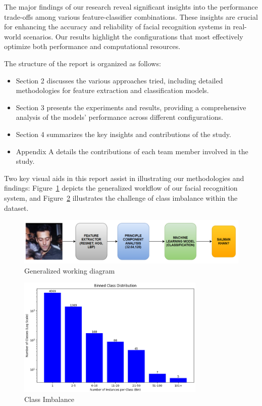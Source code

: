 \documentclass[a4paper]{article}
\theoremstyle{plain}
\theoremstyle{definition}
\begin{document}
The major findings of our research reveal significant insights into the performance trade-offs among various feature-classifier combinations. These insights are crucial for enhancing the accuracy and reliability of facial recognition systems in real-world scenarios. Our results highlight the configurations that most effectively optimize both performance and computational resources.

The structure of the report is organized as follows:
\begin{itemize}
    \item Section 2 discusses the various approaches tried, including detailed methodologies for feature extraction and classification models.
    \item Section 3 presents the experiments and results, providing a comprehensive analysis of the models' performance across different configurations.
    \item Section 4 summarizes the key insights and contributions of the study.
    \item Appendix A details the contributions of each team member involved in the study.
\end{itemize}

Two key visual aids in this report assist in illustrating our methodologies and findings: Figure~\ref{fig:workflow} depicts the generalized workflow of our facial recognition system, and Figure~\ref{fig:class_imbalance} illustrates the challenge of class imbalance within the dataset.





\begin{figure}[hbt!]
    \centering
    \includegraphics[width=1.0\textwidth]{Figs/lfw_image.png}
    \caption{Generalized working diagram}
    \label{fig:workflow}
\end{figure}

\begin{figure}[hbt!]
    \centering
    \includegraphics[width=0.8\textwidth,height=0.25\textheight]{Figs/Image.png}
    \caption{Class Imbalance}
    \label{fig:class_imbalance}
\end{figure}
\end{document}

